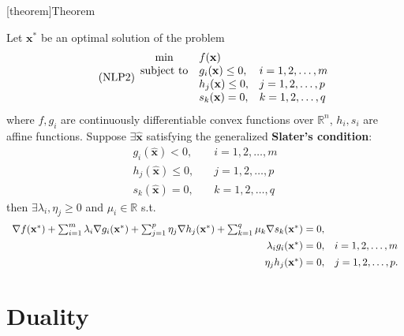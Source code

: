 \documentclass[12pt]{report}
\theoremstyle{definition}
\begin{document}
[theorem]{Theorem}
\begin{necessity of the KKT conditions under slater}
    Let $\mathbf{x}^*$ be an optimal solution of the problem
    \begin{equation}\label{eq:nlp2}
        \tag{NLP2}
        \begin{array}{c @{\quad} l @{\quad} l}
            \min & f(\mathbf{x}) & \\
            \text{subject to} & g_i(\mathbf{x})\le 0, & i=1,2,\ldots,m \\
                              & h_j(\mathbf{x})\le 0, & j=1,2,\ldots,p \\
                              & s_k(\mathbf{x})=0, & k=1,2,\ldots,q
        \end{array} 
    \end{equation} 
    where $f,g_i$ are continuously differentiable convex functions over
    $\mathbb{R}^{n}$, $h_i,s_i$ are affine functions.
    Suppose $\exists \hat{\mathbf{x}}$ satisfying the generalized \textbf{Slater's
    condition}:
    \begin{align*}
        g_i(\hat{\mathbf{x}})<0, &\quad i = 1,2,\ldots,m \\
        h_j(\hat{\mathbf{x}})\le 0, &\quad j = 1,2,\ldots,p \\
        s_k(\hat{\mathbf{x}})=0, &\quad k = 1,2,\ldots,q
    \end{align*}
    then $\exists \lambda_i,\eta_j\ge 0$ and $\mu_i\in\mathbb{R}$ s.t.
    \begin{equation*}
        \begin{array}{r @{\quad} l}
            \nabla f(\mathbf{x}^*)+\sum_{i=1}^{m}
            \lambda_i\nabla g_i(\mathbf{x}^*)+\sum_{j=1}^{p} \eta_j\nabla
            h_j(\mathbf{x}^*)+\sum_{k=1}^{q} \mu_k\nabla s_k(\mathbf{x}^*)=0, &
            \\[1ex]
            \lambda_i g_i(\mathbf{x}^*)=0, &
            i=1,2,\ldots,m \\[1ex]
            \eta_j h_j(\mathbf{x}^*)=0, &
            j=1,2,\ldots,p.
        \end{array} 
    \end{equation*}
\end{necessity of the KKT conditions under slater}


\chapter{Duality}
\end{document}
